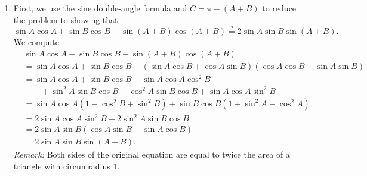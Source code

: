 \begin{enumerate}
\begin{enumerate}
\item First, we use the sine double-angle formula and $C = \pi - (A + B)$ to reduce the problem to showing that 
\begin{equation*}
\sin A\cos A + \sin B\cos B - \sin(A + B)\cos(A + B)\stackrel{?}{=} 2\sin A\sin B\sin(A + B).
\end{equation*}
We compute
\begin{align*}
&\sin A\cos A + \sin B\cos B - \sin(A + B)\cos(A + B) \\
&= \sin A\cos A + \sin B\cos B - (\sin A\cos B + \cos A\sin B)(\cos A\cos B - \sin A\sin B) \\
&= \sin A\cos A + \sin B\cos B - \sin A\cos A\cos^2 B \\
&\qquad + \sin^2 A\sin B\cos B - \cos^2 A\sin B\cos B + \sin A\cos A\sin^2 B \\
&= \sin A\cos A(1 - \cos^2 B + \sin^2 B) + \sin B\cos B(1 + \sin^2 A - \cos^2 A) \\
&= 2\sin A\cos A\sin^2 B + 2\sin^2 A\sin B\cos B \\
&= 2\sin A\sin B(\cos A\sin B + \sin A\cos B) \\
&= 2\sin A\sin B\sin(A + B).
\end{align*}
\emph{Remark:} Both sides of the original equation are equal to twice the area of a triangle with circumradius 1.
\end{enumerate}
\end{enumerate}